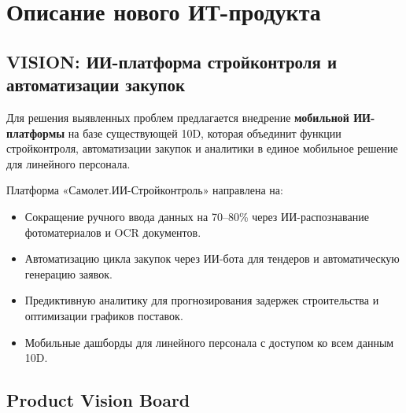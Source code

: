 \documentclass[12pt,a4paper]{article}
\begin{document}
\section{Описание нового ИТ-продукта}

\subsection{VISION: ИИ-платформа стройконтроля и автоматизации закупок}

Для решения выявленных проблем предлагается внедрение \textbf{мобильной ИИ-платформы} на базе существующей 10D, которая объединит функции стройконтроля, автоматизации закупок и аналитики в единое мобильное решение для линейного персонала.

Платформа «Самолет.ИИ-Стройконтроль» направлена на:
\begin{itemize}[leftmargin=20pt]
  \item Сокращение ручного ввода данных на 70--80\% через ИИ-распознавание фотоматериалов и OCR документов.
  \item Автоматизацию цикла закупок через ИИ-бота для тендеров и автоматическую генерацию заявок.
  \item Предиктивную аналитику для прогнозирования задержек строительства и оптимизации графиков поставок.
  \item Мобильные дашборды для линейного персонала с доступом ко всем данным 10D.
\end{itemize}

\subsection{Product Vision Board}
\end{document}

